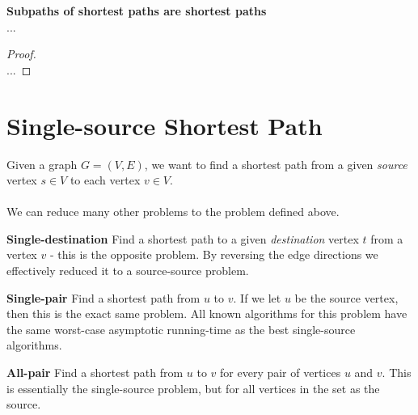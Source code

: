 \begin{lemma}
	\textbf{Subpaths of shortest paths are shortest paths} \\
	...
\end{lemma} 

\begin{proof} \textnormal{\cite[p.~645, thm.~24.1]{clrs}} \\
	...
\end{proof}

\section{Single-source Shortest Path}
Given a graph $G = (V, E)$, we want to find a shortest path from a given
\textit{source} vertex $s \in V$ to each vertex $v \in V$.
\\\\
\noindent We can reduce many other problems to the problem defined above.
\begin{description}
	\item \textbf{Single-destination} Find a shortest path to a given
\textit{destination} vertex $t$ from a vertex $v$ - this is the opposite
problem. By reversing the edge directions we effectively reduced it to a
source-source problem.
	\item \textbf{Single-pair} Find a shortest path from $u$ to $v$. If we let
$u$ be the source vertex, then this is the exact same problem. All known
algorithms for this problem have the same worst-case asymptotic running-time
as the best single-source algorithms. %
	\item \textbf{All-pair} Find a shortest path from $u$ to $v$ for every
pair of vertices $u$ and $v$. This is essentially the single-source problem,
but for all vertices in the set as the source.
\end{description}

\newpage
